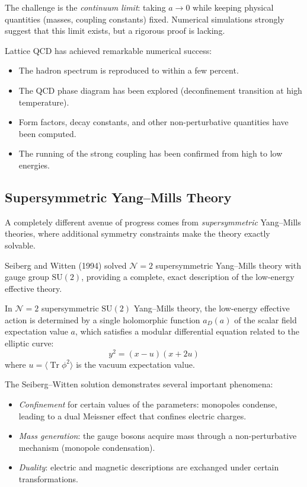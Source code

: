 The challenge is the \textit{continuum limit}: taking $a \to 0$ while keeping physical quantities (masses, coupling constants) fixed. Numerical simulations strongly suggest that this limit exists, but a rigorous proof is lacking.

Lattice QCD has achieved remarkable numerical success:
\begin{itemize}
  \item The hadron spectrum is reproduced to within a few percent.
  \item The QCD phase diagram has been explored (deconfinement transition at high temperature).
  \item Form factors, decay constants, and other non-perturbative quantities have been computed.
  \item The running of the strong coupling has been confirmed from high to low energies.
\end{itemize}

\subsection{Supersymmetric Yang--Mills Theory}

A completely different avenue of progress comes from \textit{supersymmetric} Yang--Mills theories, where additional symmetry constraints make the theory exactly solvable.

Seiberg and Witten (1994) solved $\mathcal{N} = 2$ supersymmetric Yang--Mills theory with gauge group $\mathrm{SU}(2)$, providing a complete, exact description of the low-energy effective theory.

\begin{theorem}
In $\mathcal{N} = 2$ supersymmetric $\mathrm{SU}(2)$ Yang--Mills theory, the low-energy effective action is determined by a single holomorphic function $a_D(a)$ of the scalar field expectation value $a$, which satisfies a modular differential equation related to the elliptic curve:
\[
y^2 = (x - u)(x + 2u)
\]
where $u = \langle \operatorname{Tr} \phi^2 \rangle$ is the vacuum expectation value.
\end{theorem}

The Seiberg--Witten solution demonstrates several important phenomena:
\begin{itemize}
  \item \textit{Confinement} for certain values of the parameters: monopoles condense, leading to a dual Meissner effect that confines electric charges.
  \item \textit{Mass generation}: the gauge bosons acquire mass through a non-perturbative mechanism (monopole condensation).
  \item \textit{Duality}: electric and magnetic descriptions are exchanged under certain transformations.
\end{itemize}

